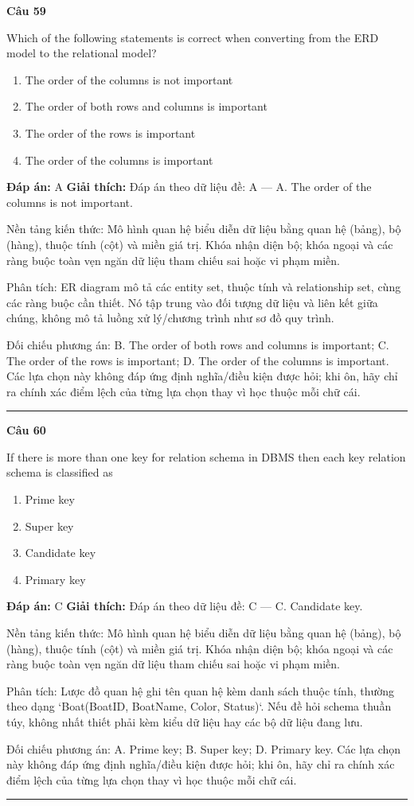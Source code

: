\documentclass[11pt,a4paper]{article}
\newenvironment{question}[1]{%
  \par\vspace{1em}\noindent\textbf{\large Câu #1}\par\vspace{0.4em}
}{%
  \par\vspace{1em}\hrule\vspace{0.6em}
}
\newenvironment{choices}{%
  \begin{enumerate}[label=\textbf{\Alph*.},leftmargin=2.2em,itemsep=2pt,topsep=3pt]
}{%
  \end{enumerate}
}
\newcommand{\choice}{\item}
\begin{document}
\begin{question}{59}
Which of the following statements is correct when converting from the ERD model to the relational model?
\begin{choices}
\choice The order of the columns is not important
\choice The order of both rows and columns is important
\choice The order of the rows is important
\choice The order of the columns is important
\end{choices}
\textbf{Đáp án:} A
\textbf{Giải thích:} Đáp án theo dữ liệu đề: A — A. The order of the columns is not important.

Nền tảng kiến thức: Mô hình quan hệ biểu diễn dữ liệu bằng quan hệ (bảng), bộ (hàng), thuộc tính (cột) và miền giá trị. Khóa nhận diện bộ; khóa ngoại và các ràng buộc toàn vẹn ngăn dữ liệu tham chiếu sai hoặc vi phạm miền.

Phân tích: ER diagram mô tả các entity set, thuộc tính và relationship set, cùng các ràng buộc cần thiết. Nó tập trung vào đối tượng dữ liệu và liên kết giữa chúng, không mô tả luồng xử lý/chương trình như sơ đồ quy trình.

Đối chiếu phương án: B. The order of both rows and columns is important; C. The order of the rows is important; D. The order of the columns is important. Các lựa chọn này không đáp ứng định nghĩa/điều kiện được hỏi; khi ôn, hãy chỉ ra chính xác điểm lệch của từng lựa chọn thay vì học thuộc mỗi chữ cái.
\end{question}

\begin{question}{60}
If there is more than one key for relation schema in DBMS then each key relation schema is classified as
\begin{choices}
\choice Prime key
\choice Super key
\choice Candidate key
\choice Primary key
\end{choices}
\textbf{Đáp án:} C
\textbf{Giải thích:} Đáp án theo dữ liệu đề: C — C. Candidate key.

Nền tảng kiến thức: Mô hình quan hệ biểu diễn dữ liệu bằng quan hệ (bảng), bộ (hàng), thuộc tính (cột) và miền giá trị. Khóa nhận diện bộ; khóa ngoại và các ràng buộc toàn vẹn ngăn dữ liệu tham chiếu sai hoặc vi phạm miền.

Phân tích: Lược đồ quan hệ ghi tên quan hệ kèm danh sách thuộc tính, thường theo dạng `Boat(BoatID, BoatName, Color, Status)`. Nếu đề hỏi schema thuần túy, không nhất thiết phải kèm kiểu dữ liệu hay các bộ dữ liệu đang lưu.

Đối chiếu phương án: A. Prime key; B. Super key; D. Primary key. Các lựa chọn này không đáp ứng định nghĩa/điều kiện được hỏi; khi ôn, hãy chỉ ra chính xác điểm lệch của từng lựa chọn thay vì học thuộc mỗi chữ cái.
\end{question}
\end{document}
